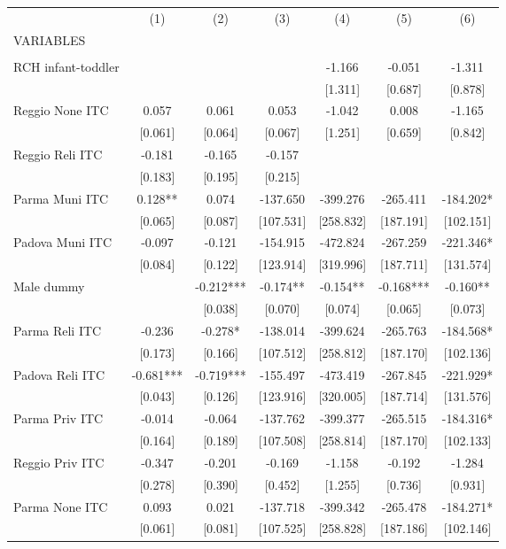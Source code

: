 \begin{tabular}{lcccccc} \hline
 & (1) & (2) & (3) & (4) & (5) & (6) \\
VARIABLES &  &  &  &  &  &  \\ \hline
 &  &  &  &  &  &  \\
RCH infant-toddler &  &  &  & -1.166 & -0.051 & -1.311 \\
 &  &  &  & [1.311] & [0.687] & [0.878] \\
Reggio None ITC & 0.057 & 0.061 & 0.053 & -1.042 & 0.008 & -1.165 \\
 & [0.061] & [0.064] & [0.067] & [1.251] & [0.659] & [0.842] \\
Reggio Reli ITC & -0.181 & -0.165 & -0.157 &  &  &  \\
 & [0.183] & [0.195] & [0.215] &  &  &  \\
Parma Muni ITC & 0.128** & 0.074 & -137.650 & -399.276 & -265.411 & -184.202* \\
 & [0.065] & [0.087] & [107.531] & [258.832] & [187.191] & [102.151] \\
Padova Muni ITC & -0.097 & -0.121 & -154.915 & -472.824 & -267.259 & -221.346* \\
 & [0.084] & [0.122] & [123.914] & [319.996] & [187.711] & [131.574] \\
Male dummy &  & -0.212*** & -0.174** & -0.154** & -0.168*** & -0.160** \\
 &  & [0.038] & [0.070] & [0.074] & [0.065] & [0.073] \\
Parma Reli ITC & -0.236 & -0.278* & -138.014 & -399.624 & -265.763 & -184.568* \\
 & [0.173] & [0.166] & [107.512] & [258.812] & [187.170] & [102.136] \\
Padova Reli ITC & -0.681*** & -0.719*** & -155.497 & -473.419 & -267.845 & -221.929* \\
 & [0.043] & [0.126] & [123.916] & [320.005] & [187.714] & [131.576] \\
Parma Priv ITC & -0.014 & -0.064 & -137.762 & -399.377 & -265.515 & -184.316* \\
 & [0.164] & [0.189] & [107.508] & [258.814] & [187.170] & [102.133] \\
Reggio Priv ITC & -0.347 & -0.201 & -0.169 & -1.158 & -0.192 & -1.284 \\
 & [0.278] & [0.390] & [0.452] & [1.255] & [0.736] & [0.931] \\
Parma None ITC & 0.093 & 0.021 & -137.718 & -399.342 & -265.478 & -184.271* \\
 & [0.061] & [0.081] & [107.525] & [258.828] & [187.186] & [102.146] \\

\end{tabular}
